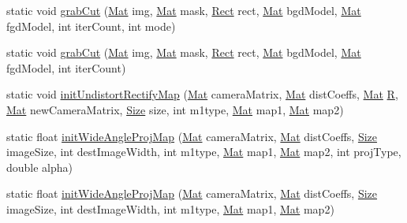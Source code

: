 \begin{DoxyCompactItemize}
\item 
static void \mbox{\hyperlink{classorg_1_1opencv_1_1imgproc_1_1_imgproc_afdc316be7c75db609235d7f9aa24bdfa}{grab\+Cut}} (\mbox{\hyperlink{classorg_1_1opencv_1_1core_1_1_mat}{Mat}} img, \mbox{\hyperlink{classorg_1_1opencv_1_1core_1_1_mat}{Mat}} mask, \mbox{\hyperlink{classorg_1_1opencv_1_1core_1_1_rect}{Rect}} rect, \mbox{\hyperlink{classorg_1_1opencv_1_1core_1_1_mat}{Mat}} bgd\+Model, \mbox{\hyperlink{classorg_1_1opencv_1_1core_1_1_mat}{Mat}} fgd\+Model, int iter\+Count, int mode)
\item 
static void \mbox{\hyperlink{classorg_1_1opencv_1_1imgproc_1_1_imgproc_a8be3ea0718f04a8b17bed9d0a46ba7cc}{grab\+Cut}} (\mbox{\hyperlink{classorg_1_1opencv_1_1core_1_1_mat}{Mat}} img, \mbox{\hyperlink{classorg_1_1opencv_1_1core_1_1_mat}{Mat}} mask, \mbox{\hyperlink{classorg_1_1opencv_1_1core_1_1_rect}{Rect}} rect, \mbox{\hyperlink{classorg_1_1opencv_1_1core_1_1_mat}{Mat}} bgd\+Model, \mbox{\hyperlink{classorg_1_1opencv_1_1core_1_1_mat}{Mat}} fgd\+Model, int iter\+Count)
\item 
static void \mbox{\hyperlink{classorg_1_1opencv_1_1imgproc_1_1_imgproc_ae7ecce50c4e0db8881a8a59a02a3fdf3}{init\+Undistort\+Rectify\+Map}} (\mbox{\hyperlink{classorg_1_1opencv_1_1core_1_1_mat}{Mat}} camera\+Matrix, \mbox{\hyperlink{classorg_1_1opencv_1_1core_1_1_mat}{Mat}} dist\+Coeffs, \mbox{\hyperlink{classorg_1_1opencv_1_1core_1_1_mat}{Mat}} \mbox{\hyperlink{classorg_1_1opencv_1_1_r}{R}}, \mbox{\hyperlink{classorg_1_1opencv_1_1core_1_1_mat}{Mat}} new\+Camera\+Matrix, \mbox{\hyperlink{classorg_1_1opencv_1_1core_1_1_size}{Size}} size, int m1type, \mbox{\hyperlink{classorg_1_1opencv_1_1core_1_1_mat}{Mat}} map1, \mbox{\hyperlink{classorg_1_1opencv_1_1core_1_1_mat}{Mat}} map2)
\item 
static float \mbox{\hyperlink{classorg_1_1opencv_1_1imgproc_1_1_imgproc_a91465eaccc847b26a082809dcd6c35bf}{init\+Wide\+Angle\+Proj\+Map}} (\mbox{\hyperlink{classorg_1_1opencv_1_1core_1_1_mat}{Mat}} camera\+Matrix, \mbox{\hyperlink{classorg_1_1opencv_1_1core_1_1_mat}{Mat}} dist\+Coeffs, \mbox{\hyperlink{classorg_1_1opencv_1_1core_1_1_size}{Size}} image\+Size, int dest\+Image\+Width, int m1type, \mbox{\hyperlink{classorg_1_1opencv_1_1core_1_1_mat}{Mat}} map1, \mbox{\hyperlink{classorg_1_1opencv_1_1core_1_1_mat}{Mat}} map2, int proj\+Type, double alpha)
\item 
static float \mbox{\hyperlink{classorg_1_1opencv_1_1imgproc_1_1_imgproc_a2e0a674f9382040bad9b7f245cdb1bbd}{init\+Wide\+Angle\+Proj\+Map}} (\mbox{\hyperlink{classorg_1_1opencv_1_1core_1_1_mat}{Mat}} camera\+Matrix, \mbox{\hyperlink{classorg_1_1opencv_1_1core_1_1_mat}{Mat}} dist\+Coeffs, \mbox{\hyperlink{classorg_1_1opencv_1_1core_1_1_size}{Size}} image\+Size, int dest\+Image\+Width, int m1type, \mbox{\hyperlink{classorg_1_1opencv_1_1core_1_1_mat}{Mat}} map1, \mbox{\hyperlink{classorg_1_1opencv_1_1core_1_1_mat}{Mat}} map2)

\end{DoxyCompactItemize}
